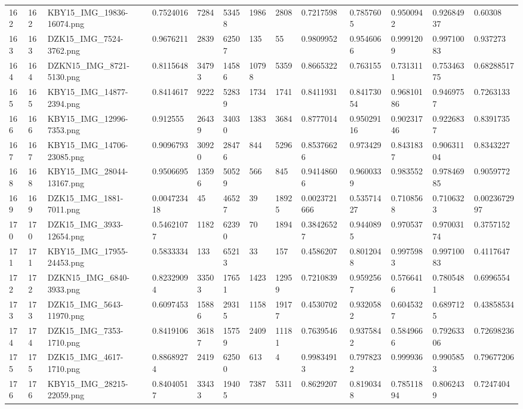 \documentclass[11pt, a4paper, twoside]{report}
\begin{document}
\begin{longtable}[c]{@{}lllllllllllll@{}}
162 & 162 & KBY15\_IMG\_19836-16074.png & 0.7524016 & 7284 & 53458 & 1986 & 2808 & 0.7217598 & 0.7857605 & 0.9500942 & 0.92684937 & 0.60308 \\
163 & 163 & DZK15\_IMG\_7524-3762.png & 0.9676211 & 2839 & 62507 & 135 & 55 & 0.9809952 & 0.9546066 & 0.9991209 & 0.99710083 & 0.937273 \\
164 & 164 & DZKN15\_IMG\_8721-5130.png & 0.8115648 & 34793 & 14586 & 10798 & 5359 & 0.8665322 & 0.763155 & 0.7313111 & 0.75346375 & 0.68288517 \\
165 & 165 & KBY15\_IMG\_14877-2394.png & 0.8414617 & 9222 & 52839 & 1734 & 1741 & 0.8411931 & 0.84173054 & 0.96810186 & 0.9469757 & 0.7263133 \\
166 & 166 & KBY15\_IMG\_12996-7353.png & 0.912555 & 26439 & 34030 & 1383 & 3684 & 0.8777014 & 0.95029116 & 0.90231746 & 0.9226837 & 0.8391735 \\
167 & 167 & KBY15\_IMG\_14706-23085.png & 0.9096793 & 30920 & 28476 & 844 & 5296 & 0.85376626 & 0.973429 & 0.8431837 & 0.90631104 & 0.8343227 \\
168 & 168 & KBY15\_IMG\_28044-13167.png & 0.9506695 & 13596 & 50529 & 566 & 845 & 0.94148606 & 0.9600339 & 0.983552 & 0.97846985 & 0.9059772 \\
169 & 169 & DZK15\_IMG\_1881-7011.png & 0.004723418 & 45 & 46527 & 39 & 18925 & 0.0023721666 & 0.53571427 & 0.7108568 & 0.7106323 & 0.0023672997 \\
170 & 170 & DZK15\_IMG\_3933-12654.png & 0.54621077 & 1182 & 62390 & 70 & 1894 & 0.38426527 & 0.9440895 & 0.970537 & 0.97003174 & 0.3757152 \\
171 & 171 & KBY15\_IMG\_17955-24453.png & 0.5833334 & 133 & 65213 & 33 & 157 & 0.4586207 & 0.8012048 & 0.9975983 & 0.99710083 & 0.4117647 \\
172 & 172 & DZKN15\_IMG\_6840-3933.png & 0.82329094 & 33503 & 17651 & 1423 & 12959 & 0.7210839 & 0.9592567 & 0.5766416 & 0.7805481 & 0.6996554 \\
173 & 173 & DZK15\_IMG\_5643-11970.png & 0.6097453 & 15886 & 29315 & 1158 & 19177 & 0.4530702 & 0.9320582 & 0.6045327 & 0.6897125 & 0.43858534 \\
174 & 174 & DZK15\_IMG\_7353-1710.png & 0.8419106 & 36187 & 15759 & 2409 & 11181 & 0.7639546 & 0.9375842 & 0.5849666 & 0.79263306 & 0.72698236 \\
175 & 175 & DZK15\_IMG\_4617-1710.png & 0.88689274 & 2419 & 62500 & 613 & 4 & 0.99834913 & 0.7978232 & 0.999936 & 0.9905853 & 0.79677206 \\
176 & 176 & KBY15\_IMG\_28215-22059.png & 0.84040517 & 33433 & 19405 & 7387 & 5311 & 0.8629207 & 0.8190348 & 0.78511894 & 0.8062439 & 0.7247404 \\

\end{longtable}
\end{document}
